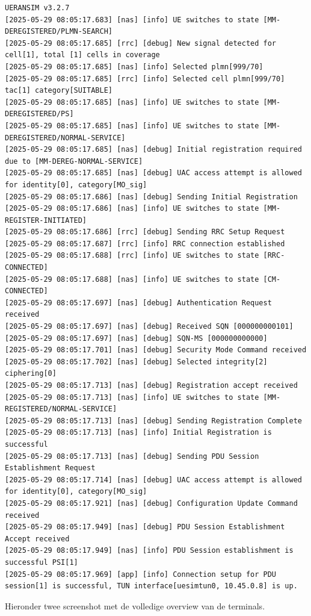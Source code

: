 \begin{lstlisting}
UERANSIM v3.2.7
[2025-05-29 08:05:17.683] [nas] [info] UE switches to state [MM-DEREGISTERED/PLMN-SEARCH]
[2025-05-29 08:05:17.685] [rrc] [debug] New signal detected for cell[1], total [1] cells in coverage
[2025-05-29 08:05:17.685] [nas] [info] Selected plmn[999/70]
[2025-05-29 08:05:17.685] [rrc] [info] Selected cell plmn[999/70] tac[1] category[SUITABLE]
[2025-05-29 08:05:17.685] [nas] [info] UE switches to state [MM-DEREGISTERED/PS]
[2025-05-29 08:05:17.685] [nas] [info] UE switches to state [MM-DEREGISTERED/NORMAL-SERVICE]
[2025-05-29 08:05:17.685] [nas] [debug] Initial registration required due to [MM-DEREG-NORMAL-SERVICE]
[2025-05-29 08:05:17.685] [nas] [debug] UAC access attempt is allowed for identity[0], category[MO_sig]
[2025-05-29 08:05:17.686] [nas] [debug] Sending Initial Registration
[2025-05-29 08:05:17.686] [nas] [info] UE switches to state [MM-REGISTER-INITIATED]
[2025-05-29 08:05:17.686] [rrc] [debug] Sending RRC Setup Request
[2025-05-29 08:05:17.687] [rrc] [info] RRC connection established
[2025-05-29 08:05:17.688] [rrc] [info] UE switches to state [RRC-CONNECTED]
[2025-05-29 08:05:17.688] [nas] [info] UE switches to state [CM-CONNECTED]
[2025-05-29 08:05:17.697] [nas] [debug] Authentication Request received
[2025-05-29 08:05:17.697] [nas] [debug] Received SQN [000000000101]
[2025-05-29 08:05:17.697] [nas] [debug] SQN-MS [000000000000]
[2025-05-29 08:05:17.701] [nas] [debug] Security Mode Command received
[2025-05-29 08:05:17.702] [nas] [debug] Selected integrity[2] ciphering[0]
[2025-05-29 08:05:17.713] [nas] [debug] Registration accept received
[2025-05-29 08:05:17.713] [nas] [info] UE switches to state [MM-REGISTERED/NORMAL-SERVICE]
[2025-05-29 08:05:17.713] [nas] [debug] Sending Registration Complete
[2025-05-29 08:05:17.713] [nas] [info] Initial Registration is successful
[2025-05-29 08:05:17.713] [nas] [debug] Sending PDU Session Establishment Request
[2025-05-29 08:05:17.714] [nas] [debug] UAC access attempt is allowed for identity[0], category[MO_sig]
[2025-05-29 08:05:17.921] [nas] [debug] Configuration Update Command received
[2025-05-29 08:05:17.949] [nas] [debug] PDU Session Establishment Accept received
[2025-05-29 08:05:17.949] [nas] [info] PDU Session establishment is successful PSI[1]
[2025-05-29 08:05:17.969] [app] [info] Connection setup for PDU session[1] is successful, TUN interface[uesimtun0, 10.45.0.8] is up.
\end{lstlisting}

Hieronder twee screenshot met de volledige overview van de terminals.

